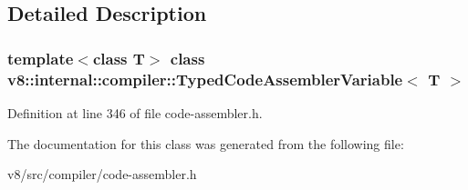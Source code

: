 \subsection{Detailed Description}
\subsubsection*{template$<$class T$>$\newline
class v8\+::internal\+::compiler\+::\+Typed\+Code\+Assembler\+Variable$<$ T $>$}



Definition at line 346 of file code-\/assembler.\+h.



The documentation for this class was generated from the following file\+:\begin{DoxyCompactItemize}
\item 
v8/src/compiler/code-\/assembler.\+h\end{DoxyCompactItemize}
